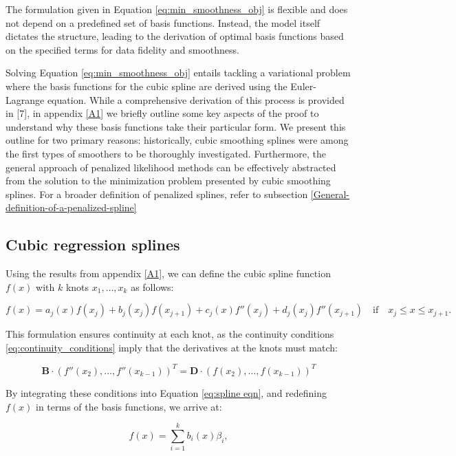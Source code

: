 \documentclass[
11pt, %
oneside, %
english, %
singlespacing, %
]{macthesis} %
\begin{document}
The formulation given in Equation \ref{eq:min_smoothness_obj} is flexible and does not depend on a predefined set of basis functions. Instead, the model itself dictates the structure, leading to the derivation of optimal basis functions based on the specified terms for data fidelity and smoothness.

Solving Equation \ref{eq:min_smoothness_obj} entails tackling a variational problem where the basis functions for the cubic spline are derived using the Euler-Lagrange equation.
While a comprehensive derivation of this process is provided in {[}7{]}, in appendix \ref{A1} we briefly outline some key aspects of the proof to understand why these basis functions take their particular form. We present this outline for two primary reasons: historically, cubic smoothing splines were among the first types of smoothers to be thoroughly investigated. Furthermore, the general approach of penalized likelihood methods can be effectively abstracted from the solution to the minimization problem presented by cubic smoothing splines. For a broader definition of penalized splines, refer to subsection \ref{General-definition-of-a-penalized-spline}

\subsection{Cubic regression splines}\label{Cubic-regression-splines}

Using the results from appendix \ref{A1}, we can define the cubic spline function \(f(x)\) with \(k\) knots \(x_1, \dots, x_k\) as follows:

\begin{equation}
f(x) = a_j(x)f(x_j) + b_j(x_j)f(x_{j+1}) + c_j(x)f''(x_j) + d_j(x_j)f''(x_{j+1}) \quad \text{if} \quad x_j \leq x \leq x_{j+1}.
\label{eq:spline eqn}
\end{equation}

This formulation ensures continuity at each knot, as the continuity conditions \ref{eq:continuity_conditions} imply that the derivatives at the knots must match:

\[\mathbf{B} \cdot (f''(x_2),\dots, f''(x_{k-1}))^{T} = \mathbf{D} \cdot (f(x_2),\dots, f(x_{k-1}))^{T}
\]

By integrating these conditions into Equation \ref{eq:spline eqn}, and redefining \(f(x)\) in terms of the basis functions, we arrive at:

\begin{equation}
f(x) = \sum_{i=1}^{k}b_i(x)\beta_i,
\label{eq:spline sum}
\end{equation}
\end{document}
